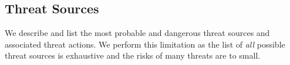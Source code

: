 \documentclass{article}
\begin{document}

	
	
	



\subsection{Threat Sources}

We describe and list the most probable and dangerous threat sources and associated threat actions. We perform this limitation as the list of \emph{all} possible threat sources is exhaustive and the risks of many threats are to small. 
\end{document}
